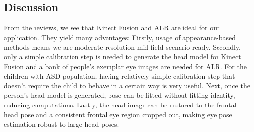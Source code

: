 \subsection{Discussion}
From the reviews, we see that Kinect Fusion and ALR are ideal for our application.  They yield many advantages:  Firstly, usage of appearance-based methods means we are moderate resolution mid-field scenario ready.  Secondly, only a simple calibration step is needed to generate the head model for Kinect Fusion and a bank of people's exemplar eye images are needed for ALR.  For the children with ASD population, having relatively simple calibration step that doesn't require the child to behave in a certain way is very useful.  Next, once the person's head model is generated, pose can be fitted without fitting identity, reducing computations.  Lastly, the head image can be restored to the frontal head pose and a consistent frontal eye region cropped out, making eye pose estimation robust to large head poses.
